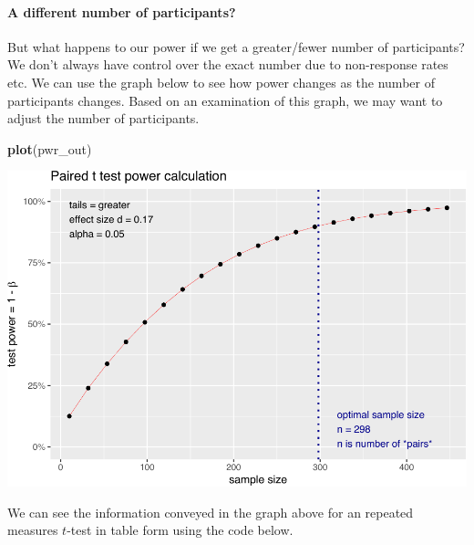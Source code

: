 \documentclass[
]{krantz}
\makeatletter
\newenvironment{Shaded}{\begin{snugshade}}{\end{snugshade}}
\newcommand{\KeywordTok}[1]{\textcolor[rgb]{0.27,0.27,0.27}{\textbf{#1}}}
\newcommand{\NormalTok}[1]{#1}
\newenvironment{kframe}{%
\medskip{}
\setlength{\fboxsep}{.8em}
 \def\at@end@of@kframe{}%
 \ifinner\ifhmode%
  \def\at@end@of@kframe{\end{minipage}}%
  \begin{minipage}{\columnwidth}%
 \fi\fi%
 \def\FrameCommand##1{\hskip\@totalleftmargin \hskip-\fboxsep
 \colorbox{shadecolor}{##1}\hskip-\fboxsep
     \hskip-\linewidth \hskip-\@totalleftmargin \hskip\columnwidth}%
 \MakeFramed {\advance\hsize-\width
   \@totalleftmargin\z@ \linewidth\hsize
   \@setminipage}}%
 {\par\unskip\endMakeFramed%
 \at@end@of@kframe}
\renewenvironment{Shaded}{\begin{kframe}}{\end{kframe}}
\makeatother
\begin{document}
\hypertarget{a-different-number-of-participants-1}{%
\paragraph{A different number of participants?}\label{a-different-number-of-participants-1}}

But what happens to our power if we get a greater/fewer number of participants? We don't always have control over the exact number due to non-response rates etc. We can use the graph below to see how power changes as the number of participants changes. Based on an examination of this graph, we may want to adjust the number of participants.

\begin{Shaded}
\begin{Highlighting}[]
\KeywordTok{plot}\NormalTok{(pwr_out)}
\end{Highlighting}
\end{Shaded}

\includegraphics{bookdown_files/figure-latex/unnamed-chunk-248-1.pdf}

We can see the information conveyed in the graph above for an repeated measures \(t\)-test in table form using the code below.
\end{document}
